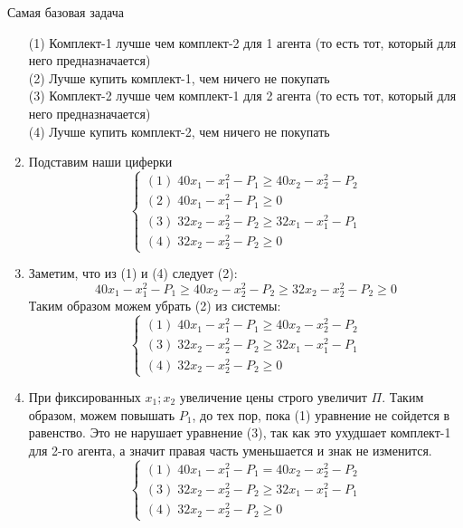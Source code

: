 \begin{mybox}{Самая базовая задача}
\begin{enumerate}
\begin{equation*}
    \end{equation*}
    (1) Комплект-1 лучше чем комплект-2 для 1 агента (то есть тот, который для него предназначается)\\
    (2) Лучше купить комплект-1, чем ничего не покупать\\
    (3) Комплект-2 лучше чем комплект-1 для 2 агента (то есть тот, который для него предназначается)\\
    (4) Лучше купить комплект-2, чем ничего не покупать
    \item Подставим наши циферки
    \begin{equation*}
     \begin{cases}
       (1)\;40x_1-x_1^2-P_1\geq 40x_2-x_2^2-P_2
       \\
       (2)\;40x_1-x_1^2-P_1\geq 0
       \\
       (3)\;32x_2-x_2^2-P_2\geq 32x_1-x_1^2-P_1
       \\
       (4)\;32x_2-x_2^2-P_2\geq 0
     \end{cases}
    \end{equation*}
    \item Заметим, что из (1) и (4) следует (2):
    $$40x_1-x_1^2-P_1\geq 40x_2-x_2^2-P_2\geq 32x_2-x_2^2-P_2\geq 0$$
    Таким образом можем убрать (2) из системы:
    \begin{equation*}
     \begin{cases}
       (1)\;40x_1-x_1^2-P_1\geq 40x_2-x_2^2-P_2
       \\
       (3)\;32x_2-x_2^2-P_2\geq 32x_1-x_1^2-P_1
       \\
       (4)\;32x_2-x_2^2-P_2\geq 0
     \end{cases}
    \end{equation*}
    \item При фиксированных $x_1;x_2$ увеличение цены строго увеличит $\Pi$. Таким образом, можем повышать $P_1$, до тех пор, пока (1) уравнение не сойдется в равенство. Это не нарушает уравнение (3), так как это ухудшает комплект-1 для 2-го агента, а значит правая часть уменьшается и знак не изменится.
    \begin{equation*}
     \begin{cases}
       (1)\;40x_1-x_1^2-P_1= 40x_2-x_2^2-P_2
       \\
       (3)\;32x_2-x_2^2-P_2\geq 32x_1-x_1^2-P_1
       \\
       (4)\;32x_2-x_2^2-P_2\geq 0
     \end{cases}
    \end{equation*}

\end{enumerate}
\end{mybox}
